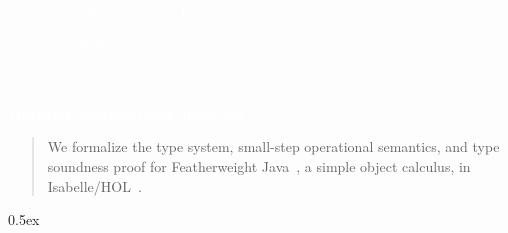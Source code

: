\documentclass[11pt,a4paper]{article}
\begin{document}
\centerline{\bighel \textcolor{white}{A Theory of Featherweight Java}}
\centerline{\bighel \textcolor{white}{in Isabelle/HOL}}
\vspace{22mm}
\centerline{\medhel \textcolor{white}{J. Nathan Foster and Dimitrios Vytiniotis}}
\centerline{\tt \textcolor{white}{\bf \{jnfoster,dimitriv\}@cis.upenn.edu}}


\vspace{15mm}

\begin{abstract}
We formalize the type system, small-step operational semantics, and
type soundness proof for Featherweight Java~\cite{FJ}, a simple
object calculus, in Isabelle/HOL~\cite{LNCS2283}.
\end{abstract}

\tableofcontents

\parindent 0pt\parskip 0.5ex





\end{document}

